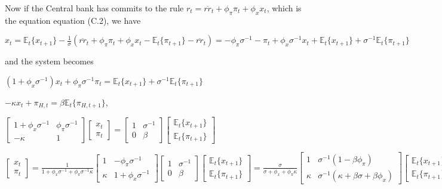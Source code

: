 \documentclass[
]{article}
\begin{document}
Now if the Central bank has commits to the rule
\(r_t=\overline{rr}_t+\phi_\pi \pi_t+\phi_x x_t\), which is the equation
equation (C.2), we have

\(\displaystyle x_t = \mathbb{E}_t\{x_{t+1}\} -\frac{1}{\sigma}(\overline{rr}_t+\phi_\pi \pi_{t}+\phi_x x_t-\mathbb{E}_t\{\pi_{t+1}\} -\overline{rr}_t)= -\phi_\pi \sigma^{-1} -\pi_{t}+\phi_x \sigma^{-1} x_t + \mathbb{E}_t\{x_{t+1}\}+ \sigma^{-1}\mathbb{E}_t\{\pi_{t+1}\}\)

and the system becomes

\(\displaystyle (1+\phi_x \sigma^{-1})x_t +\phi_\pi \sigma^{-1}\pi_{t} = \mathbb{E}_t\{x_{t+1}\} +\sigma^{-1}\mathbb{E}_t\{\pi_{t+1}\}\)

\(-\kappa x_t +\pi_{H,t}=\beta \mathbb{E}_t\{ \pi_{H,t+1}\}\),

\(\displaystyle \left[ \begin{matrix} 1+\phi_x \sigma^{-1} & \phi_\pi \sigma^{-1}\\ -\kappa & 1 \end{matrix} \right] \left[ \begin{matrix} x_t\\ \pi_t \end{matrix} \right] = \left[ \begin{matrix} 1 & \sigma^{-1} \\ 0 & \beta \end{matrix} \right] \left[ \begin{matrix} \mathbb{E}_t\{x_{t+1} \}\\ \mathbb{E}_t \{\pi_{t+1} \} \end{matrix} \right]\)

\(\displaystyle \left[ \begin{matrix} x_t\\ \pi_t \end{matrix} \right] = \frac{1}{1+\phi_x \sigma^{-1}+ \phi_\pi \sigma^{-1} \kappa} \left[ \begin{matrix} 1 & -\phi_\pi \sigma^{-1}\\ \kappa & 1+\phi_x \sigma^{-1} \end{matrix} \right] \left[ \begin{matrix} 1 & \sigma^{-1} \\ 0 & \beta \end{matrix} \right] \left[ \begin{matrix} \mathbb{E}_t\{x_{t+1} \}\\ \mathbb{E}_t \{\pi_{t+1} \} \end{matrix} \right]=\frac{\sigma}{\sigma+\phi_x + \phi_\pi \kappa}\left[ \begin{matrix} 1& \sigma^{-1}(1-\beta \phi_\pi)\\ \kappa & \sigma^{-1}(\kappa+\beta \sigma+\beta\phi_x) \end{matrix} \right] \left[ \begin{matrix} \mathbb{E}_t\{x_{t+1} \}\\ \mathbb{E}_t \{\pi_{t+1} \} \end{matrix} \right]\)
\end{document}
